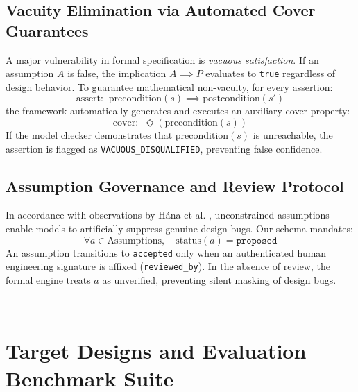 \documentclass[11pt,a4paper]{article}
\begin{document}
\subsection{Vacuity Elimination via Automated Cover Guarantees}
A major vulnerability in formal specification is \textit{vacuous satisfaction}. If an assumption $A$ is false, the implication $A \implies P$ evaluates to \texttt{true} regardless of design behavior. 
To guarantee mathematical non-vacuity, for every assertion:
\begin{equation}
    \text{assert: } \ \text{precondition}(s) \implies \text{postcondition}(s')
\end{equation}
the framework automatically generates and executes an auxiliary cover property:
\begin{equation}
    \text{cover: } \ \Diamond \left(\text{precondition}(s)\right)
\end{equation}
If the model checker demonstrates that $\text{precondition}(s)$ is unreachable, the assertion is flagged as \texttt{VACUOUS\_DISQUALIFIED}, preventing false confidence.

\subsection{Assumption Governance and Review Protocol}
In accordance with observations by Hána et al. \cite{hana2027pkcs}, unconstrained assumptions enable models to artificially suppress genuine design bugs. Our schema mandates:
\begin{equation}
    \forall a \in \text{Assumptions}, \quad \text{status}(a) = \texttt{proposed}
\end{equation}
An assumption transitions to \texttt{accepted} only when an authenticated human engineering signature is affixed (\texttt{reviewed\_by}). In the absence of review, the formal engine treats $a$ as unverified, preventing silent masking of design bugs.

---

\section{Target Designs and Evaluation Benchmark Suite}
\end{document}
